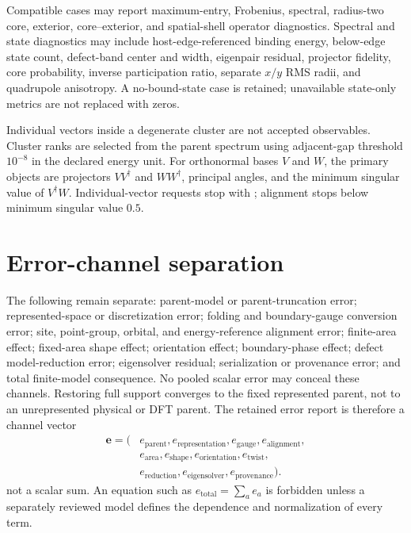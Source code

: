\documentclass[11pt]{article}
\begin{document}
Compatible cases may report maximum-entry, Frobenius, spectral, radius-two core,
exterior, core--exterior, and spatial-shell operator diagnostics.  Spectral and state
diagnostics may include host-edge-referenced binding energy, below-edge state count,
defect-band center and width, eigenpair residual, projector fidelity, core probability,
inverse participation ratio, separate $x/y$ RMS radii, and quadrupole anisotropy.  A
no-bound-state case is retained; unavailable state-only metrics are not replaced with
zeros.

Individual vectors inside a degenerate cluster are not accepted observables.  Cluster
ranks are selected from the parent spectrum using adjacent-gap threshold $10^{-8}$ in
the declared energy unit.  For orthonormal bases $V$ and $W$, the primary objects are
projectors $VV^\dagger$ and $WW^\dagger$, principal angles, and the minimum singular
value of $V^\dagger W$.  Individual-vector requests stop with
; alignment stops below minimum singular
value $0.5$.

\section{Error-channel separation}

The following remain separate: parent-model or parent-truncation error; represented-space
or discretization error; folding and boundary-gauge conversion error; site,
point-group, orbital, and energy-reference alignment error; finite-area effect;
fixed-area shape effect; orientation effect; boundary-phase effect; defect
model-reduction error; eigensolver residual; serialization or provenance error; and
total finite-model consequence.  No pooled scalar error may conceal these channels.
Restoring full support converges to the fixed represented parent, not to an unrepresented
physical or DFT parent.  The retained error report is therefore a channel vector
\begin{equation}
  \begin{aligned}
  \mathbf e=(&e_{\mathrm{parent}},e_{\mathrm{representation}},
   e_{\mathrm{gauge}},e_{\mathrm{alignment}},\\
   &e_{\mathrm{area}},e_{\mathrm{shape}},e_{\mathrm{orientation}},
   e_{\mathrm{twist}},\\
   &e_{\mathrm{reduction}},e_{\mathrm{eigensolver}},
   e_{\mathrm{provenance}}).
  \end{aligned}
\end{equation}
not a scalar sum.  An equation such as $e_{\mathrm{total}}=\sum_a e_a$ is forbidden
unless a separately reviewed model defines the dependence and normalization of every
term.
\end{document}
